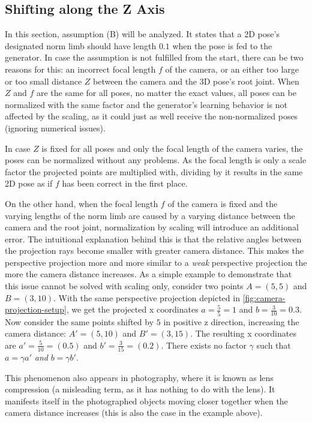 	
\subsection{Shifting along the Z Axis}
\label{sec:z-shift-error}

In this section, assumption (B) will be analyzed.
It states that a 2D pose's designated norm limb should have length $0.1$ when the pose is fed to the generator.
In case the assumption is not fulfilled from the start, there can be two reasons for this: 
an incorrect focal length $f$ of the camera, or an either too large or too small distance $Z$ between the camera and the 3D pose's root joint.
When $Z$ and $f$ are the same for all poses, no matter the exact values, all poses can be normalized with the same factor and the generator's learning behavior is not affected by the scaling, as it could just as well receive the non-normalized poses (ignoring numerical issues).

In case $Z$ is fixed for all poses and only the focal length of the camera varies, the poses can be normalized without any problems.
As the focal length is only a scale factor the projected points are multiplied with, dividing by it results in the same 2D pose as if $f$ has been correct in the first place.

On the other hand, when the focal length $f$ of the camera is fixed and the varying lengths of the norm limb are caused by a varying distance between the camera and the root joint, normalization by scaling will introduce an additional error.
The intuitional explanation behind this is that the relative angles between the projection rays become smaller with greater camera distance.
This makes the perspective projection more and more similar to a \emph{weak} perspective projection the more the camera distance increases.
As a simple example to demonstrate that this issue cannot be solved with scaling only, consider two points $A = (5, 5)$ and $B = (3, 10)$. 
With the same perspective projection depicted in \autoref{fig:camera-projection-setup}, we get the projected x coordinates $a = \frac{5}{5} = 1$ and $b = \frac{3}{10} = 0.3$.
Now consider the same points shifted by $5$ in positive z direction, increasing the camera distance: $A' = (5, 10)$ and $B' = (3, 15)$.
The resulting x coordinates are $a' = \frac{5}{10} = (0.5)$ and $b' = \frac{3}{15} = (0.2)$.
There exists no factor $\gamma$ such that $a = \gamma a'$ \emph{and} $b = \gamma b'$.

This phenomenon also appears in photography, where it is known as lens compression (a misleading term, as it has nothing to do with the lens).
It manifests itself in the photographed objects moving closer together when the camera distance increases (this is also the case in the example above).

